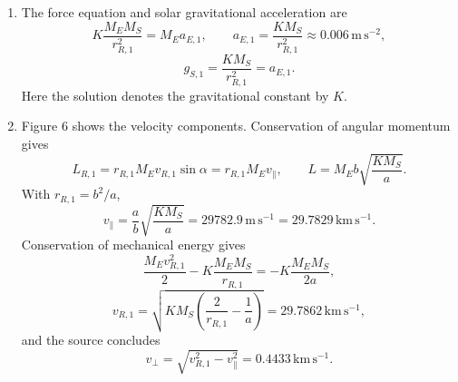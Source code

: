 \begin{description}
\begin{enumerate}
    \[
    \frac{x^2}{a^2}+\frac{y^2}{b^2}=1,\qquad
    \frac{a^2-b^2}{a^2}+\frac{r_{R,1}^2}{b^2}=1,
    \]
    so
    \[
    r_{R,1}=\frac{b^2}{a}=149563841.9\,\mathrm{km}.
    \]
  \item The force equation and solar gravitational acceleration are
    \[
    K\frac{M_EM_S}{r_{R,1}^2}=M_Ea_{E,1},\qquad
    a_{E,1}=\frac{KM_S}{r_{R,1}^2}\approx0.006\,\mathrm{m\,s^{-2}},
    \]
    \[
    g_{S,1}=\frac{KM_S}{r_{R,1}^2}=a_{E,1}.
    \]
    Here the solution denotes the gravitational constant by $K$.
  \item Figure 6 shows the velocity components.
    Conservation of angular momentum gives
    \[
    L_{R,1}=r_{R,1}M_Ev_{R,1}\sin\alpha
      =r_{R,1}M_Ev_\parallel,
    \qquad L=M_Eb\sqrt{\frac{KM_S}{a}}.
    \]
    With $r_{R,1}=b^2/a$,
    \[
    v_\parallel=\frac{a}{b}\sqrt{\frac{KM_S}{a}}
      =29782.9\,\mathrm{m\,s^{-1}}=29.7829\,\mathrm{km\,s^{-1}}.
    \]
    Conservation of mechanical energy gives
    \[
    \frac{M_Ev_{R,1}^2}{2}-K\frac{M_EM_S}{r_{R,1}}
      =-K\frac{M_EM_S}{2a},
    \]
    \[
    v_{R,1}=\sqrt{KM_S\left(\frac2{r_{R,1}}-\frac1a\right)}
      =29.7862\,\mathrm{km\,s^{-1}},
    \]
    and the source concludes
    \[
    v_\perp=\sqrt{v_{R,1}^2-v_\parallel^2}
      =0.4433\,\mathrm{km\,s^{-1}}.
    \]
  \end{enumerate}
\end{description}
